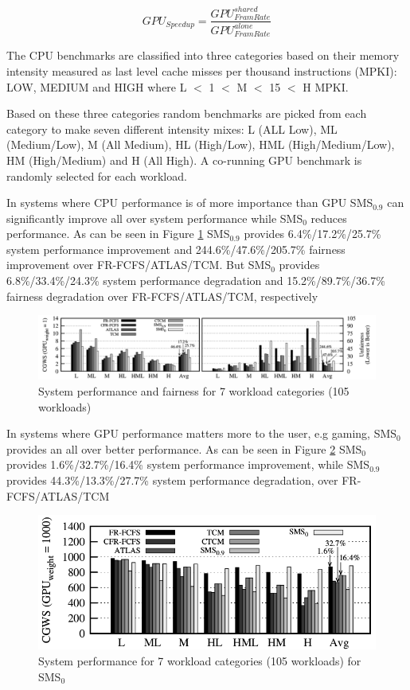 \documentclass[12pt,journal,compsoc]{IEEEtran}
\begin{document}
\begin{equation}
GPU_{Speedup} = \frac{GPU_{FramRate}^{shared}}{GPU_{FramRate}^{alone}}
\end{equation}

The CPU benchmarks are classified into three categories based on their memory intensity measured as last level cache misses per thousand instructions (MPKI): LOW, MEDIUM and HIGH where L $<$ 1 $<$ M $<$ 15 $<$ H MPKI.

Based on these three categories random benchmarks are picked from each category to make seven different intensity mixes: L (ALL Low), ML (Medium/Low), M (All Medium), HL (High/Low),  HML (High/Medium/Low),  HM (High/Medium) and H (All High).  A co-running GPU benchmark is randomly selected for each workload.

In systems where CPU performance is of more importance than GPU SMS$_{0.9}$ can significantly improve all over system performance while SMS$_0$ reduces performance. As can be seen in Figure \ref{fig:SmS_GPU_1} SMS$_{0.9}$ provides 6.4\%/17.2\%/25.7\% system performance improvement and 244.6\%/47.6\%/205.7\% fairness improvement over FR-FCFS/ATLAS/TCM.
But SMS$_0$ provides 6.8\%/33.4\%/24.3\% system performance degradation and 15.2\%/89.7\%/36.7\% fairness degradation over FR-FCFS/ATLAS/TCM, respectively \cite{SmS}

\begin{figure}[H]
	\centering
	\includegraphics[width = 9.2 cm]{graphics/GPU_W_1.png}
	\caption{System performance and fairness for 7 workload categories (105 workloads) \cite{SmS}}\label{fig:SmS_GPU_1}
\end{figure}

In systems where GPU performance matters more to the user, e.g gaming, SMS$_0$ provides an all over better performance.  As can be seen in Figure \ref{fig:SmS_GPU_1000}  SMS$_0$ provides 1.6\%/32.7\%/16.4\% system performance improvement, while SMS$_{0.9}$ provides 44.3\%/13.3\%/27.7\% system performance degradation, over FR-FCFS/ATLAS/TCM

\begin{figure}[H]
	\centering
	\includegraphics[width = 9 cm]{graphics/GPU_W_1000.png}
	\caption{System performance for 7 workload categories (105 workloads) for SMS$_0$ \cite{SmS}}\label{fig:SmS_GPU_1000}
\end{figure}
\end{document}
